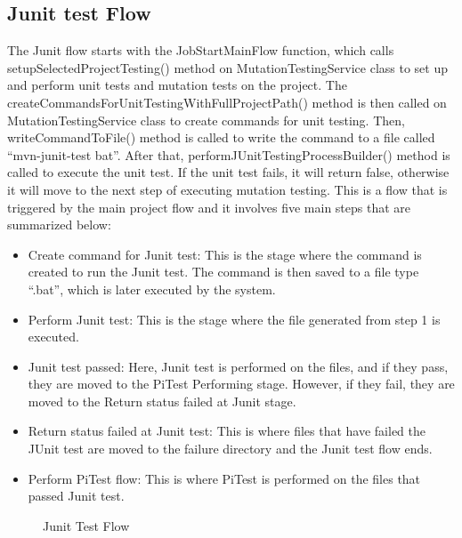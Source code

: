 \subsection{Junit test Flow}
The Junit flow starts with the JobStartMainFlow function, which calls setupSelectedProjectTesting() method on MutationTestingService class to set up and perform unit tests and mutation tests on the project. The createCommandsForUnitTestingWithFullProjectPath() method is then called on MutationTestingService class to create commands for unit testing. 
Then, writeCommandToFile() method is called to write the command to a file called “mvn-junit-test bat”. After that, performJUnitTestingProcessBuilder() method is called to execute the unit test. If the unit test fails, it will return false, otherwise it will move to the next step of executing mutation testing. This is a flow that is triggered by the main project flow and it involves five main steps that are summarized below:
\begin{itemize}
\item Create command for Junit test: This is the stage where the command is created to run the Junit test. The command is then saved to a file type “.bat”, which is later executed by the system.
\item Perform Junit test: This is the stage where the file generated from step 1 is executed.
\item Junit test passed: Here, Junit test is performed on the files, and if they pass, they are moved to the PiTest Performing stage. However, if they fail, they are moved to the Return status failed at Junit stage.
\item Return status failed at Junit test: This is where files that have failed the JUnit test are moved to the failure directory and the Junit test flow ends. 
\item Perform PiTest flow: This is where PiTest is performed on the files that passed Junit test. 
\end{itemize}
\begin{figure}[h!]
	\centering
    \caption{Junit Test Flow }
	\label{fig:f33}
\end{figure}\\

